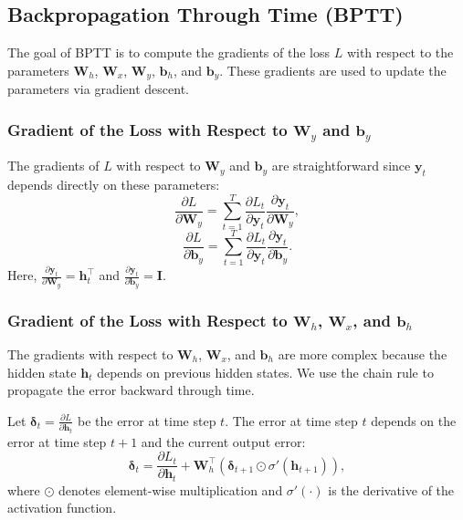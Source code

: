 \documentclass{article}
\begin{document}
\subsection*{Backpropagation Through Time (BPTT)}

The goal of BPTT is to compute the gradients of the loss \( L \) with respect to the parameters \( \mathbf{W}_h \), \( \mathbf{W}_x \), \( \mathbf{W}_y \), \( \mathbf{b}_h \), and \( \mathbf{b}_y \). These gradients are used to update the parameters via gradient descent.

\subsubsection*{Gradient of the Loss with Respect to \( \mathbf{W}_y \) and \( \mathbf{b}_y \)}

The gradients of \( L \) with respect to \( \mathbf{W}_y \) and \( \mathbf{b}_y \) are straightforward since \( \mathbf{y}_t \) depends directly on these parameters:
\[
\frac{\partial L}{\partial \mathbf{W}_y} = \sum_{t=1}^T \frac{\partial L_t}{\partial \mathbf{y}_t} \frac{\partial \mathbf{y}_t}{\partial \mathbf{W}_y},
\]
\[
\frac{\partial L}{\partial \mathbf{b}_y} = \sum_{t=1}^T \frac{\partial L_t}{\partial \mathbf{y}_t} \frac{\partial \mathbf{y}_t}{\partial \mathbf{b}_y}.
\]
Here, \( \frac{\partial \mathbf{y}_t}{\partial \mathbf{W}_y} = \mathbf{h}_t^\top \) and \( \frac{\partial \mathbf{y}_t}{\partial \mathbf{b}_y} = \mathbf{I} \).

\subsubsection*{Gradient of the Loss with Respect to \( \mathbf{W}_h \), \( \mathbf{W}_x \), and \( \mathbf{b}_h \)}

The gradients with respect to \( \mathbf{W}_h \), \( \mathbf{W}_x \), and \( \mathbf{b}_h \) are more complex because the hidden state \( \mathbf{h}_t \) depends on previous hidden states. We use the chain rule to propagate the error backward through time.

Let \( \mathbf{\delta}_t = \frac{\partial L}{\partial \mathbf{h}_t} \) be the error at time step \( t \). The error at time step \( t \) depends on the error at time step \( t+1 \) and the current output error:
\[
\mathbf{\delta}_t = \frac{\partial L_t}{\partial \mathbf{h}_t} + \mathbf{W}_h^\top (\mathbf{\delta}_{t+1} \odot \sigma'(\mathbf{h}_{t+1})),
\]
where \( \odot \) denotes element-wise multiplication and \( \sigma'(\cdot) \) is the derivative of the activation function.
\end{document}
